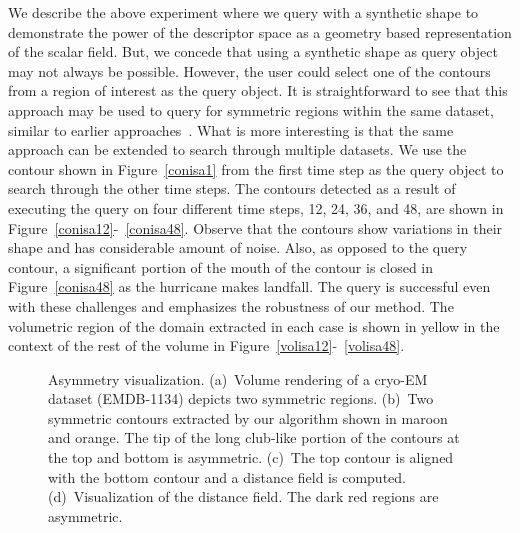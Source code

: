 \documentclass[review,journal]{vgtc}         %
\begin{document}
We describe the above experiment where we query with
a synthetic shape to demonstrate the power of the descriptor space as a geometry based representation 
of the scalar field. But, we concede that using a synthetic shape as query object may not always be 
possible. However, the user could select one of the contours from a region of interest as the query
object. It is straightforward to see that this approach may be used
to query for symmetric regions within the same dataset, similar to earlier approaches~\cite{ThomN13,MasoodTN13}.
What is more interesting is that the same approach can be extended to search through multiple datasets.
We use the contour shown in Figure~\ref{conisa1} from the first time step as the query object to search through 
the other time steps. The contours detected as a result of executing the query on four different time 
steps, 12, 24, 36, and 48, are shown in Figure~\ref{conisa12}-~\ref{conisa48}. Observe that
the contours show variations in their shape and has considerable amount of noise. 
Also, as opposed to the query contour, a significant portion
of the mouth of the contour is closed in Figure~\ref{conisa48} as the hurricane makes landfall.
The query is successful even with these challenges and emphasizes the robustness of our method.
The volumetric region of the domain extracted in each case is shown in yellow in the context of the rest
of the volume in Figure~\ref{volisa12}-~\ref{volisa48}.
\begin{figure*}[t]
	\centering
	\caption{Asymmetry visualization. (a)~Volume rendering of a cryo-EM dataset (EMDB-1134) 
	depicts two symmetric regions. (b)~Two symmetric contours extracted by our algorithm shown
in maroon and orange. The tip of the long club-like portion of the contours at the top and bottom is asymmetric.
(c)~The top contour is aligned with the bottom contour and a distance field is computed. (d)~Visualization
of the distance field. The dark red regions are asymmetric.}
\end{figure*}
\end{document}
